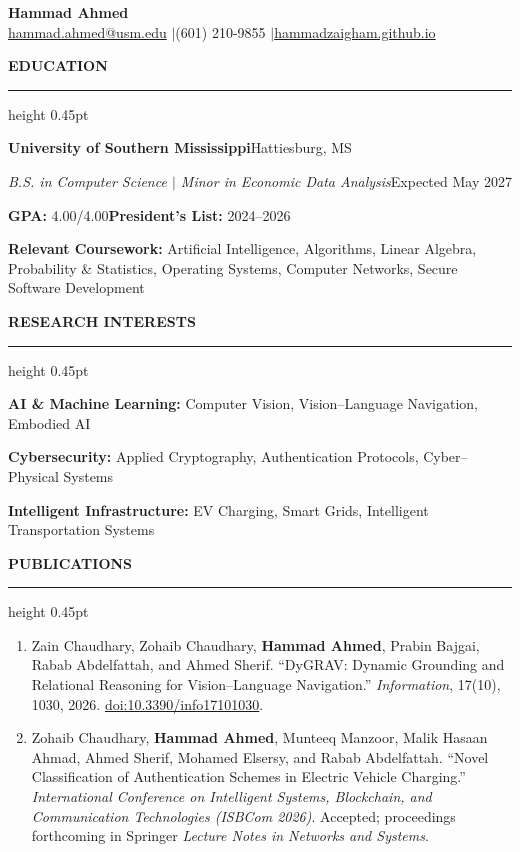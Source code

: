 \documentclass[11pt]{article}
\newcommand{\cvsection}[1]{%
  \Needspace{4\baselineskip}%
  \par\addvspace{8.5pt}%
  \noindent\textbf{\MakeUppercase{#1}}\par\nobreak
  \vspace{2pt}\hrule height 0.45pt\relax\nobreak\vspace{4pt}%
}
\newcommand{\entryheading}[4]{%
  \textbf{#1}\hfill #2\par
  \textit{#3}\hfill #4\par
}
\begin{document}
\begin{center}
  {\LARGE\textbf{Hammad Ahmed}}\\[3pt]
  \href{mailto:hammad.ahmed@usm.edu}{hammad.ahmed@usm.edu}
  \quad$\vert$\quad (601) 210-9855
  \quad$\vert$\quad \href{https://hammadzaigham.github.io/}{hammadzaigham.github.io}
\end{center}
\vspace{-5pt}

\cvsection{Education}
\entryheading{University of Southern Mississippi}{Hattiesburg, MS}
  {B.S. in Computer Science $\vert$ Minor in Economic Data Analysis}{Expected May 2027}
\textbf{GPA:} 4.00/4.00\hfill\textbf{President's List:} 2024--2026\par\vspace{2pt}
\textbf{Relevant Coursework:} Artificial Intelligence, Algorithms, Linear Algebra, Probability \& Statistics,
Operating Systems, Computer Networks, Secure Software Development

\cvsection{Research Interests}
\textbf{AI \& Machine Learning:} Computer Vision, Vision--Language Navigation, Embodied AI\par
\textbf{Cybersecurity:} Applied Cryptography, Authentication Protocols, Cyber--Physical Systems\par
\textbf{Intelligent Infrastructure:} EV Charging, Smart Grids, Intelligent Transportation Systems

\cvsection{Publications}
\begin{enumerate}
  \item Zain Chaudhary, Zohaib Chaudhary, \textbf{Hammad Ahmed}, Prabin Bajgai,
  Rabab Abdelfattah, and Ahmed Sherif. ``DyGRAV: Dynamic Grounding and Relational
  Reasoning for Vision--Language Navigation.'' \textit{Information}, 17(10),
  1030, 2026. \href{https://doi.org/10.3390/info17101030}{doi:10.3390/info17101030}.

  \item Zohaib Chaudhary, \textbf{Hammad Ahmed}, Munteeq Manzoor, Malik Hasaan Ahmad,
  Ahmed Sherif, Mohamed Elsersy, and Rabab Abdelfattah. ``Novel Classification
  of Authentication Schemes in Electric Vehicle Charging.''
  \textit{International Conference on Intelligent Systems, Blockchain, and
  Communication Technologies (ISBCom 2026)}. Accepted; proceedings forthcoming
  in Springer \textit{Lecture Notes in Networks and Systems}.
\end{enumerate}
\end{document}
